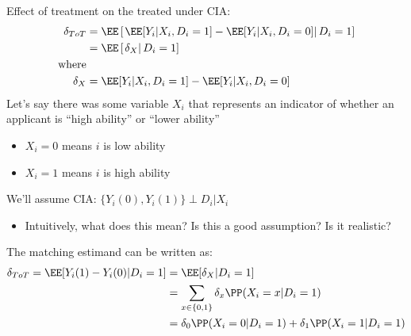 \documentclass[compress, 8pt]{beamer}
\begin{document}
\begin{frame}{}

Effect of treatment on the treated under CIA: 
\begin{align*}
    \delta_{ToT} &= \EE \left[ \left.
            {\EE [Y_{i} \vert X_i, D_i=1]}
            - {\EE [Y_{i} \vert X_i, D_i=0]}        
            \right\vert D_i = 1
        \right] \\
        &= \EE \left[ \left. 
            \delta_X
        \right\vert D_i = 1\right] \\
    \text{where} & \\
        \delta_X &= {\EE [Y_{i} \vert X_i, D_i=1]}
            - {\EE [Y_{i} \vert X_i, D_i=0]}
\end{align*}
Let's say there was some variable $X_i$ that represents an indicator of whether an applicant is ``high ability'' or ``lower ability''
\begin{itemize}
    \item $X_i = 0$ means $i$ is low ability 
    \item $X_i = 1$ means $i$ is high ability
\end{itemize}
We'll assume CIA: $\{Y_i(0), Y_i (1)\} \perp D_i \vert X_i$ 
\begin{itemize}
    \item Intuitively, what does this mean? Is this a good assumption? Is it realistic?
\end{itemize}

The matching estimand can be written as:
\begin{align*}
    \delta_{ToT} = \EE [Y_i (1) - Y_i(0) \vert D_i = 1] &= \EE [\delta_X \vert D_i = 1] \\
    &= \sum_{x \in \{0, 1\}} \delta_x \PP(X_i = x \vert D_i = 1 ) \\
    &= \delta_0 \PP (X_i = 0 \vert D_i = 1)
    + \delta_1 \PP (X_i = 1 \vert D_i = 1)
\end{align*}
\end{frame}
\end{document}
